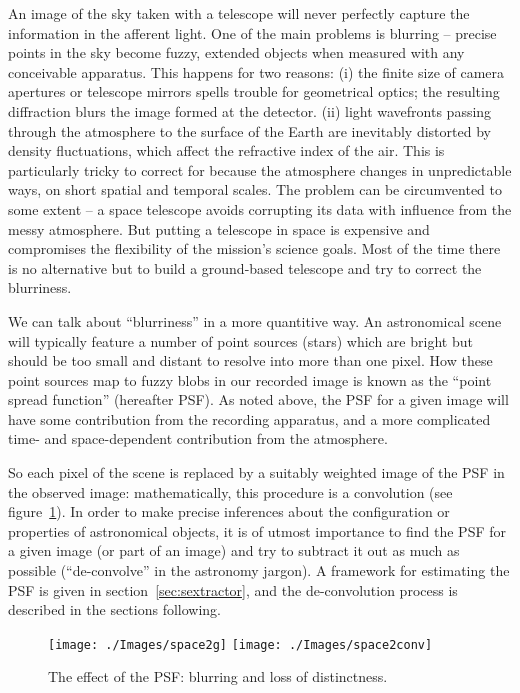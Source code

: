 \documentclass[letterpaper, 11pt]{article}
\begin{document}
An image of the sky taken with a telescope will never perfectly capture the information in the afferent light. One of the main problems is blurring -- precise points in the sky become fuzzy, extended objects when measured with any conceivable apparatus. This happens for two reasons: (i) the finite size of camera apertures or telescope mirrors spells trouble for geometrical optics; the resulting diffraction blurs the image formed at the detector. (ii) light wavefronts passing through the atmosphere to the surface of the Earth are inevitably distorted by density fluctuations, which affect the refractive index of the air. This is particularly tricky to correct for because the atmosphere changes in unpredictable ways, on short spatial and temporal scales. The problem can be circumvented to some extent -- a space telescope avoids corrupting its data with influence from the messy atmosphere. But putting a telescope in space is expensive and compromises the flexibility of the mission's science goals. Most of the time there is no alternative but to build a ground-based telescope and try to correct the blurriness.

We can talk about ``blurriness'' in a more quantitive way. An astronomical scene will typically feature a number of point sources (stars) which are bright but should be too small and distant to resolve into more than one pixel. How these point sources map to fuzzy blobs in our recorded image is known as the ``point spread function'' (hereafter PSF). As noted above, the PSF for a given image will have some contribution from the recording apparatus, and a more complicated time- and space-dependent contribution from the atmosphere.

So each pixel of the scene is replaced by a suitably weighted image of the PSF in the observed image: mathematically, this procedure is a convolution (see figure~\ref{fig:fuzz}).
In order to make precise inferences about the configuration or properties of astronomical objects, it is of utmost importance to find the PSF for a given image (or part of an image) and try to subtract it out as much as possible (``de-convolve'' in the astronomy jargon). A framework for estimating the PSF is given in section~\ref{sec:sextractor}, and the de-convolution process is described in the sections following.

\begin{figure}
	\centering
	\texttt{[image: ./Images/space2g]}
	\texttt{[image: ./Images/space2conv]}	
	\caption{The effect of the PSF: blurring and loss of distinctness.}
	\label{fig:fuzz}
\end{figure}
\end{document}
